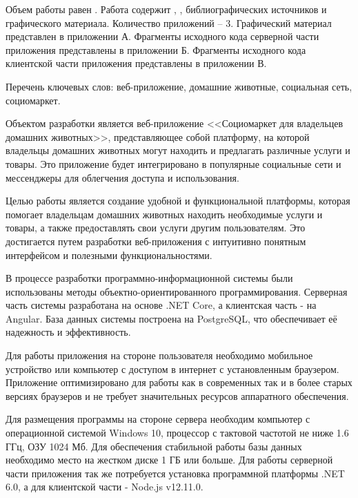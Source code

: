 
Объем работы равен . Работа содержит , ,  библиографических источников и  графического материала. Количество приложений – 3. Графический материал представлен в приложении А. Фрагменты исходного кода серверной части приложения представлены в приложении Б. Фрагменты исходного кода клиентской части приложения представлены в приложении В.

Перечень ключевых слов: веб-приложение, домашние животные, социальная сеть, социомаркет.

Объектом разработки является веб-приложение <<Социомаркет для владельцев домашних животных>>, представляющее собой платформу, на которой владельцы домашних животных могут находить и предлагать различные услуги и товары. Это приложение будет интегрировано в популярные социальные сети и мессенджеры для облегчения доступа и использования.

Целью работы является создание удобной и функциональной платформы, которая помогает владельцам домашних животных находить необходимые услуги и товары, а также предоставлять свои услуги другим пользователям. Это достигается путем разработки веб-приложения с интуитивно понятным интерфейсом и полезными функциональностями.

В процессе разработки программно-информационной системы были использованы методы объектно-ориентированного программирования. Серверная часть системы разработана на основе .NET Core, а клиентская часть -\- на Angular. База данных системы построена на PostgreSQL, что обеспечивает её надежность и эффективность.

Для работы приложения на стороне пользователя необходимо мобильное устройство или компьютер с доступом в интернет с установленным браузером. Приложение оптимизировано для работы как в современных так и в более старых версиях браузеров и не требует значительных ресурсов аппаратного обеспечения.

Для размещения программы на стороне сервера необходим компьютер с операционной системой Windows 10, процессор с тактовой частотой не ниже 1.6 ГГц, ОЗУ 1024 Мб. Для обеспечения стабильной работы базы данных необходимо место на жестком диске 1 ГБ или больше. Для работы серверной части приложения так же потребуется установка программной платформы .NET 6.0, а для клиентской части -\- Node.js v12.11.0.

